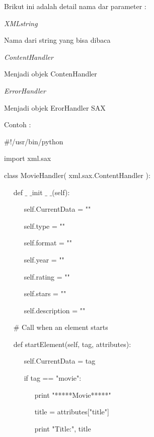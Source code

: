 \documentclass{wileySix}
\begin{document}
\begin{myEnumerate}
	\vspace{12pt}
	Brikut ini adalah detail nama dar parameter : \par
	\noindent 
	\item \textit{XMLstring} \par
	Nama dari string yang bisa dibaca \par
	\noindent 
	\item \textit{ContentHandler} \par
	Menjadi objek ContenHandler \par
	\noindent 
	\item \textit{ErrorHandler} \par
	Menjadi objek ErorHandler SAX \par
	\vspace{12pt}
	\noindent 
	Contoh : \par
	\noindent 
	$  \#  $!/usr/bin/python \par
	\vspace{12pt}
	\noindent 
	import xml.sax \par
	\vspace{12pt}
	\noindent 
	class MovieHandler( xml.sax.ContentHandler ): \par
	\noindent 
	~~ def  $  \_  $ $  \_  $init $  \_  $ $  \_  $(self): \par
	\noindent 
	~~~~~ self.CurrentData = "" \par
	\noindent 
	~~~~~ self.type = "" \par
	\noindent 
	~~~~~ self.format = "" \par
	\noindent 
	~~~~~ self.year = "" \par
	\noindent 
	~~~~~ self.rating = "" \par
	\noindent 
	~~~~~ self.stars = "" \par
	\noindent 
	~~~~~ self.description = "" \par
	\vspace{12pt}
	\noindent 
	~~  $  \#  $ Call when an element starts \par
	\noindent 
	~~ def startElement(self, tag, attributes): \par
	\noindent 
	~~~~~ self.CurrentData = tag \par
	\noindent 
	~~~~~ if tag == "movie": \par
	\noindent 
	~~~~~~~~ print "*****Movie*****" \par
	\noindent 
	~~~~~~~~ title = attributes["title"] \par
	\noindent 
	~~~~~~~~ print "Title:", title \par

\end{myEnumerate}
\end{document}
